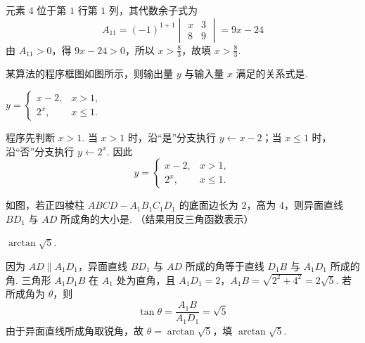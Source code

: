\begin{solution}
元素 \(4\) 位于第 \(1\) 行第 \(1\) 列，其代数余子式为
\[
A_{11}=(-1)^{1+1}\begin{vmatrix}x&3\\8&9\end{vmatrix}=9x-24
\]
由 \(A_{11}>0\)，得 \(9x-24>0\)，所以 \(x>\frac{8}{3}\)，故填 \(x>\frac{8}{3}\).
\end{solution}

\begin{problem}
某算法的程序框图如图所示，则输出量 \(y\) 与输入量 \(x\) 满足的关系式是\fillinblank{}.

\end{problem}

\begin{answer}
\(y = \begin{cases}
x-2, & x>1,\\
2^x, & x\leqslant 1.
\end{cases}\)
\end{answer}

\begin{solution}
程序先判断 \(x>1\). 当 \(x>1\) 时，沿“是”分支执行 \(y\leftarrow x-2\)；当 \(x\leqslant1\) 时，沿“否”分支执行 \(y\leftarrow2^x\). 因此
\[
y=\begin{cases}
x-2,&x>1,\\
2^x,&x\leqslant1.
\end{cases}
\]
\end{solution}

\begin{problem}
如图，若正四棱柱 \(ABCD - A_1B_1C_1D_1\) 的底面边长为 \(2\)，高为 \(4\)，则异面直线 \(BD_1\) 与 \(AD\) 所成角的大小是\fillinblank{}. （结果用反三角函数表示）

\end{problem}

\begin{answer}
\(\arctan\sqrt{5}\).
\end{answer}

\begin{solution}
因为 \(AD\parallel A_1D_1\)，异面直线 \(BD_1\) 与 \(AD\) 所成的角等于直线 \(D_1B\) 与 \(A_1D_1\) 所成的角. 三角形 \(A_1D_1B\) 在 \(A_1\) 处为直角，且 \(A_1D_1=2\)，\(A_1B=\sqrt{2^2+4^2}=2\sqrt5\). 若所成角为 \(\theta\)，则
\[
\tan\theta=\frac{A_1B}{A_1D_1}=\sqrt5
\]
由于异面直线所成角取锐角，故 \(\theta=\arctan\sqrt5\)，填 \(\arctan\sqrt5\).
\end{solution}

